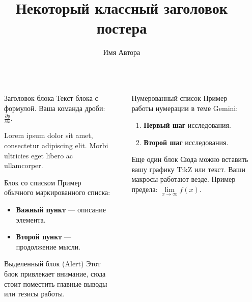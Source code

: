 \documentclass[final]{beamer}
\title{Некоторый классный заголовок постера}
\author{Имя Автора}
\institute[МГУ]{Московский государственный университет имени М.В. Ломоносова}
\newcommand{\fr}{\frac}
\newcommand{\limm}{\lim\limits}
\newlength{\sepwidth}
\newlength{\colwidth}
\newcommand{\separatorcolumn}{\begin{column}{\sepwidth}\end{column}}
\begin{document}
\begin{frame}[t]
\begin{columns}[t]
\separatorcolumn

\begin{column}{\colwidth}

  \begin{block}{Заголовок блока}
    Текст блока с формулой. Ваша команда дроби: $\fr{\partial y}{\partial x}$.
    
    Lorem ipsum dolor sit amet, consectetur adipiscing elit. Morbi ultricies eget libero ac ullamcorper.

  \end{block}

  \begin{block}{Блок со списком}
    Пример обычного маркированного списка:
    \begin{itemize}
      \item \textbf{Важный пункт} — описание элемента.
      \item \textbf{Второй пункт} — продолжение мысли.
    \end{itemize}
  \end{block}

  \begin{alertblock}{Выделенный блок (Alert)}
    Этот блок привлекает внимание, сюда стоит поместить главные выводы или тезисы работы.
  \end{alertblock}

\end{column}

\separatorcolumn

\begin{column}{\colwidth}

  \begin{block}{Нумерованный список}
    Пример работы нумерации в теме Gemini:
    \begin{enumerate}
      \item \textbf{Первый шаг} исследования.
      \item \textbf{Второй шаг} исследования.
    \end{enumerate}
  \end{block}

  \begin{block}{Еще один блок}
    Сюда можно вставить вашу графику TikZ или текст. Ваши макросы работают везде.
    Пример предела: $\limm_{x \to \infty} f(x)$.
  \end{block}


\end{column}
\end{columns}
\end{frame}
\end{document}
